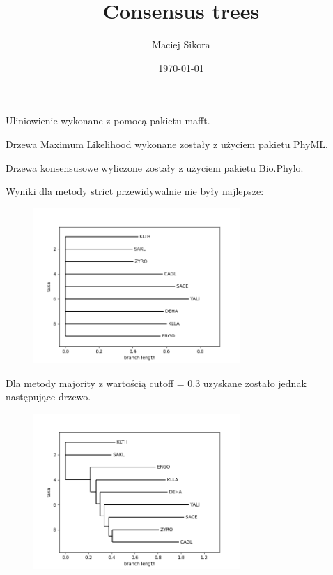 \documentclass[12pt]{article}
\title{Consensus trees}
\author{Maciej Sikora}
\date{\specialdate\today}
\begin{document}
\maketitle

Uliniowienie wykonane z pomocą pakietu mafft.

Drzewa Maximum Likelihood wykonane zostały z użyciem pakietu PhyML.

Drzewa konsensusowe  wyliczone zostały z użyciem pakietu Bio.Phylo.

Wyniki dla metody strict przewidywalnie nie były najlepsze:
\begin{figure}[H]
\begin{center}
\includegraphics[width=0.7\textwidth]{strict}
\end{center}
\end{figure}


Dla metody majority z wartością cutoff = 0.3 uzyskane zostało jednak następujące drzewo.
\begin{figure}[H]
\begin{center}
\includegraphics[width=0.7\textwidth]{cons_30}
\end{center}
\end{figure}
\end{document}
